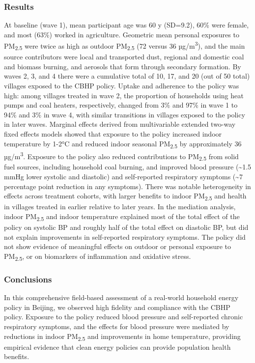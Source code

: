 \documentclass[
  letterpaper,
  DIV=11,
  numbers=noendperiod]{scrartcl}
\begin{document}
\subsubsection*{Results}\label{results}

At baseline (wave 1), mean participant age was 60 y (SD=9.2), 60\% were
female, and most (63\%) worked in agriculture. Geometric mean personal
exposures to PM\textsubscript{2.5} were twice as high as outdoor
PM\textsubscript{2.5} (72 versus 36 µg/m\textsuperscript{3}), and the
main source contributors were local and transported dust, regional and
domestic coal and biomass burning, and aerosols that form through
secondary formation. By waves 2, 3, and 4 there were a cumulative total
of 10, 17, and 20 (out of 50 total) villages exposed to the CBHP policy.
Uptake and adherence to the policy was high: among villages treated in
wave 2, the proportion of households using heat pumps and coal heaters,
respectively, changed from 3\% and 97\% in wave 1 to 94\% and 3\% in
wave 4, with similar transitions in villages exposed to the policy in
later waves. Marginal effects derived from multivariable extended
two-way fixed effects models showed that exposure to the policy
increased indoor temperature by 1-2°C and reduced indoor seasonal
PM\textsubscript{2.5} by approximately 36 µg/m\textsuperscript{3}.
Exposure to the policy also reduced contributions to
PM\textsubscript{2.5} from solid fuel sources, including household coal
burning, and improved blood pressure (\textasciitilde1.5 mmHg lower
systolic and diastolic) and self-reported respiratory symptoms
(\textasciitilde7 percentage point reduction in any symptoms). There was
notable heterogeneity in effects across treatment cohorts, with larger
benefits to indoor PM\textsubscript{2.5} and health in villages treated
in earlier relative to later years. In the mediation analysis, indoor
PM\textsubscript{2.5} and indoor temperature explained most of the total
effect of the policy on systolic BP and roughly half of the total effect
on diastolic BP, but did not explain improvements in self-reported
respiratory symptoms. The policy did not show evidence of meaningful
effects on outdoor or personal exposure to PM\textsubscript{2.5}, or on
biomarkers of inflammation and oxidative stress.

\subsubsection*{Conclusions}\label{conclusions}

In this comprehensive field-based assessment of a real-world household
energy policy in Beijing, we observed high fidelity and compliance with
the CBHP policy. Exposure to the policy reduced blood pressure and
self-reported chronic respiratory symptoms, and the effects for blood
pressure were mediated by reductions in indoor PM\textsubscript{2.5} and
improvements in home temperature, providing empirical evidence that
clean energy policies can provide population health benefits.
\end{document}
